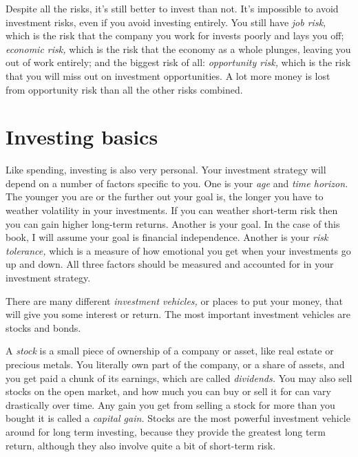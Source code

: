 Despite all the risks, it's still better to invest than not. It's impossible to avoid investment risks, even if you avoid investing entirely. You still have \emph{job risk,} which is the risk that the company you work for invests poorly and lays you off; \emph{economic risk,} which is the risk that the economy as a whole plunges, leaving you out of work entirely; and the biggest risk of all: \emph{opportunity risk,} which is the risk that you will miss out on investment opportunities. A lot more money is lost from opportunity risk than all the other risks combined.

\section{Investing basics}
Like spending, investing is also very personal. Your investment strategy will depend on a number of factors specific to you. One is your \emph{age} and \emph{time horizon.} The younger you are or the further out your goal is, the longer you have to weather volatility in your investments. If you can weather short-term risk then you can gain higher long-term returns. Another is your goal. In the case of this book, I will assume your goal is financial independence. Another is your \emph{risk tolerance,} which is a measure of how emotional you get when your investments go up and down. All three factors should be measured and accounted for in your investment strategy.

There are many different \emph{investment vehicles,} or places to put your money, that will give you some interest or return. The most important investment vehicles are stocks and bonds.

A \emph{stock} is a small piece of ownership of a company or asset, like real estate or precious metals. You literally own part of the company, or a share of assets, and you get paid a chunk of its earnings, which are called \emph{dividends.} You may also sell stocks on the open market, and how much you can buy or sell it for can vary drastically over time. Any gain you get from selling a stock for more than you bought it is called a \emph{capital gain.} Stocks are the most powerful investment vehicle around for long term investing, because they provide the greatest long term return, although they also involve quite a bit of short-term risk.

